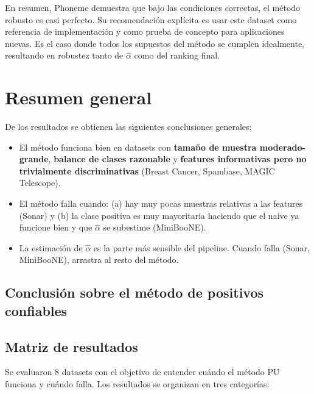 \documentclass[a4paper,11pt]{article}
\begin{document}
En resumen, Phoneme demuestra que bajo las condiciones correctas, el método robusto es casi perfecto. Su recomendación explícita es usar este dataset como referencia de implementación y como prueba de concepto para aplicaciones nuevas. Es el caso donde todos los supuestos del método se cumplen idealmente, resultando en robustez tanto de $\hat{\alpha}$ como del ranking final.

\section{Resumen general}

De los resultados se obtienen las siguientes conclusiones generales:

\begin{itemize}
    \item El método funciona bien en datasets con \textbf{tamaño de muestra moderado-grande}, \textbf{balance de clases razonable} y \textbf{features informativas pero no trivialmente discriminativas} (Breast Cancer, Spambase, MAGIC Telescope).
    \item El método falla cuando: (a) hay muy pocas muestras relativas a las features (Sonar) y (b) la clase positiva es muy mayoritaria haciendo que el naive ya funcione bien y que $\hat{\alpha}$ se subestime (MiniBooNE).
    \item La estimación de $\hat{\alpha}$ es la parte más sensible del pipeline. Cuando falla (Sonar, MiniBooNE), arrastra al resto del método.
    
\end{itemize}

\subsection{Conclusión sobre el método de positivos confiables}
\subsection{Matriz de resultados}

Se evaluaron 8 datasets con el objetivo de entender cuándo el método PU funciona y cuándo falla. Los resultados se organizan en tres categorías:
\end{document}
